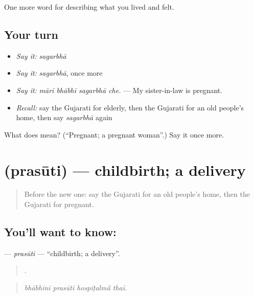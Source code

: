 \begin{grammarlens}[title={What you've built}]
One more word for describing what you lived and felt.
\end{grammarlens}

\subsection*{Your turn}
\begin{itemize}
\raggedright
  \item \emph{Say it:} \emph{sagarbhā}
  \item \emph{Say it:} \emph{sagarbhā}, once more
  \item \emph{Say it:} \emph{mārī bhābhī sagarbhā che.} — My sister-in-law is pregnant.
  \item \emph{Recall:} say the Gujarati for elderly, then the Gujarati for an old people's home, then say \emph{sagarbhā} again
\end{itemize}

\begin{tcolorbox}[breakable,colback=teal!4,colframe=teal!35!black,title={Before you move on}]
What does  mean? (\textquotedblleft{}Pregnant; a pregnant woman\textquotedblright{}.) Say it once more.
\end{tcolorbox}
\section[\texorpdfstring{\gu{પ્રસૂતિ} (prasūti)}{પ્રસૂતિ (prasūti)}]{ (prasūti) — childbirth; a delivery}

\label{lesson:GU-C495-prasuti}



\begin{quote}
Before the new one: say the Gujarati for an old people's home, then the Gujarati for pregnant.
\end{quote}

\subsection*{You'll want to know: }
\textbf{} — \emph{prasūti} — \textquotedblleft{}childbirth; a delivery\textquotedblright{}.

\begin{quote}
   .
\end{quote}

\begin{quote}
\emph{bhābhīnī prasūti hospiṭalmā̃ thaī.}
\end{quote}

